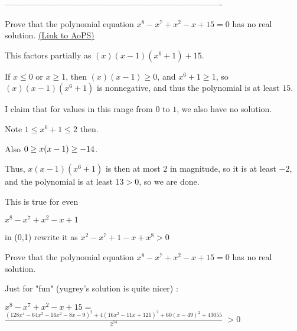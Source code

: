 -------------------------------------------------------------------------------

\begin{problem}
	Prove that the polynomial equation $x^{8}-x^{7}+x^{2}-x+15=0$ has no real solution.
	\flushright \href{https://artofproblemsolving.com/community/c6h479486}{(Link to AoPS)}
\end{problem}



\begin{solution}
	This factors partially as $(x)(x-1)(x^6+1)+15$.

If $x\le 0$ or $x\ge 1$, then $(x)(x-1)\ge 0$, and $x^6+1\ge 1$, so $(x)(x-1)(x^6+1)$ is nonnegative, and thus the polynomial is at least $15$.

I claim that for values in this range from $0$ to $1$, we also have no solution.

Note $1\le x^6+1\le 2$ then.

Also $0\ge x(x-1)\ge -1\/4$.

Thus, $x(x-1)(x^6+1)$ is then at most $2$ in magnitude, so it is at least $-2$, and the polynomial is at least $13>0$, so we are done.
\end{solution}



\begin{solution}
	This is true for even

$x^8 - x^7 + x^2 - x + 1$

in (0,1) rewrite it as $x^2 - x^7 + 1- x + x^8 > 0$
\end{solution}



\begin{solution}
	\begin{tcolorbox}Prove that the polynomial equation $x^{8}-x^{7}+x^{2}-x+15=0$ has no real solution.\end{tcolorbox}
Just for "fun" (yugrey's solution is quite nicer) :

$x^8-x^7+x^2-x+15=$ $\frac{(128x^4-64x^3-16x^2-8x-9)^2+4(16x^2-11x+121)^2+60(x-49)^2+43055}{2^{14}}$ $>0$
\end{solution}



